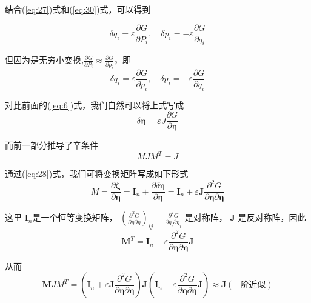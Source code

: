 \documentclass[12pt]{ctexart}
\begin{document}
结合(\ref{eq:27})式和(\ref{eq:30})式，可以得到

\begin{equation}
    \delta q_i=\varepsilon\frac{\partial G}{\partial P_i},\quad\delta p_i=-\varepsilon\frac{\partial G}{\partial q_i}
    \end{equation}
    
    但因为是无穷小变换,$\frac{\partial G}{\partial P_i}\approx\frac{\partial G}{\partial p_i}$，即
    \begin{equation}
    \boxed{\delta q_i=\varepsilon\frac{\partial G}{\partial p_i},\quad\delta p_i=-\varepsilon\frac{\partial G}{\partial q_i}}
    \end{equation}
    
    对比前面的(\ref{eq:6})式，我们自然可以将上式写成
    \begin{equation}
    \boxed{\delta\boldsymbol{\eta}=\varepsilon J\frac{\partial G}{\partial\boldsymbol{\eta}}}
    \label{eq:33}
    \end{equation}
    
    而前一部分推导了辛条件
    \begin{equation}
    MJM^T=J
    \end{equation}
    
    通过(\ref{eq:28})式，我们可将变换矩阵写成如下形式
    \begin{equation}M=\frac{\partial\boldsymbol{\zeta}}{\partial\boldsymbol{\eta}}=\boldsymbol{I}_n+\frac{\partial\delta\boldsymbol{\eta}}{\partial\boldsymbol{\eta}}=\boldsymbol{I}_n+\varepsilon\boldsymbol{J}\frac{\partial^2G}{\partial\boldsymbol{\eta}\partial\boldsymbol{\eta}}
    \end{equation}

  这里 $\boldsymbol{I}_n$是一个恒等变换矩阵， $\left(\frac{\partial^2G}{\partial\eta\partial\eta}\right)_{ij}=\frac{\partial^2G}{\partial\eta_i\partial\eta_j}$ 是对称阵，
    $\boldsymbol{J}$ 是反对称阵，因此
    \begin{equation}
    \boldsymbol{M}^T=\boldsymbol{I}_n-\varepsilon\frac{\partial^2G}{\partial\boldsymbol{\eta}\partial\boldsymbol{\eta}}\boldsymbol{J}
    \end{equation}
    
    从而
    \begin{equation}\boldsymbol MJM^T=\left(\boldsymbol{I}_n+\varepsilon\boldsymbol{J}\frac{\partial^2G}{\partial\boldsymbol{\eta}\partial\boldsymbol{\eta}}\right)\boldsymbol{J}\left(\boldsymbol{I}_n-\varepsilon\frac{\partial^2G}{\partial\boldsymbol{\eta}\partial\boldsymbol{\eta}}\boldsymbol{J}\right)\approx\boldsymbol{J}\left(\boldsymbol{-}\text{阶近似}\right)
    \end{equation}
\end{document}
